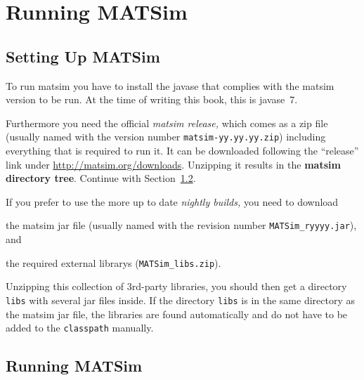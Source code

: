
\section{Running MATSim}
\label{sec:runningmatsim}

\subsection{Setting Up MATSim}
\label{sec:settingUpMatsim}

To run \gls{matsim} you have to install the \gls{javase} that complies with the \gls{matsim} version to be run. At the time of writing this book, this is \gls{javase}~7.

Furthermore you need the official \emph{\gls{matsim} release,} which comes as a zip file (usually named with the version number \lstinline|matsim-yy.yy.yy.zip|) including everything that is required to run it. It can be downloaded following the ``release'' link under \url{http://matsim.org/downloads}.
Unzipping it results in the \textbf{\gls{matsim} directory tree}.   Continue with Section~\ref{sec:runexample}.

If you prefer to use the more up to date \emph{nightly builds,} you need to download
\begin{compactitem}
\item the \gls{matsim} \gls{jar} file (usually named with the revision number \lstinline|MATSim_ryyyy.jar|), and

\item the required external \glspl{library} (\lstinline|MATSim_libs.zip|). 

Unzipping this collection of 3rd-party libraries, you should then get a directory \lstinline|libs| with several \gls{jar} files inside. If the directory \lstinline|libs| is in the same directory as the \gls{matsim} \gls{jar} file, the libraries are found automatically and do not have to be added to the \lstinline|classpath| manually.
\end{compactitem}

\subsection{Running MATSim}
\label{sec:runexample}


